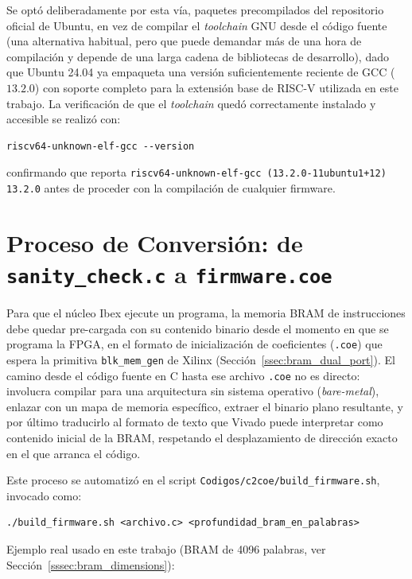 Se optó deliberadamente por esta vía, paquetes precompilados del
repositorio oficial de Ubuntu, en vez de compilar el \textit{toolchain}
GNU desde el código fuente (una alternativa habitual, pero que puede
demandar más de una hora de compilación y depende de una larga cadena de
bibliotecas de desarrollo), dado que Ubuntu 24.04 ya empaqueta una versión
suficientemente reciente de GCC ($13.2.0$) con soporte completo para la
extensión base de RISC-V utilizada en este trabajo. La verificación de que
el \textit{toolchain} quedó correctamente instalado y accesible se
realizó con:

\begin{lstlisting}[style=bashstyle]
riscv64-unknown-elf-gcc --version
\end{lstlisting}

confirmando que reporta \texttt{riscv64-unknown-elf-gcc
(13.2.0-11ubuntu1+12) 13.2.0} antes de proceder con la compilación de
cualquier firmware.

\section{Proceso de Conversión: de \texttt{sanity\_check.c} a \texttt{firmware.coe}}
\label{sec:pipeline_c_a_coe}

Para que el núcleo Ibex ejecute un programa, la memoria BRAM de
instrucciones debe quedar pre-cargada con su contenido binario desde el
momento en que se programa la FPGA, en el formato de inicialización de
coeficientes (\texttt{.coe}) que espera la primitiva \texttt{blk\_mem\_gen}
de Xilinx (Sección~\ref{ssec:bram_dual_port}). El camino desde el código
fuente en C hasta ese archivo \texttt{.coe} no es directo: involucra
compilar para una arquitectura sin sistema operativo (\textit{bare-metal}),
enlazar con un mapa de memoria específico, extraer el binario plano
resultante, y por último traducirlo al formato de texto que Vivado puede
interpretar como contenido inicial de la BRAM, respetando el
desplazamiento de dirección exacto en el que arranca el código.

Este proceso se automatizó en el script
\texttt{Codigos/c2coe/build\_firmware.sh}, invocado como:
\begin{lstlisting}[style=bashstyle]
./build_firmware.sh <archivo.c> <profundidad_bram_en_palabras>
\end{lstlisting}

Ejemplo real usado en este trabajo (BRAM de 4096 palabras, ver Sección~\ref{sssec:bram_dimensions}):

